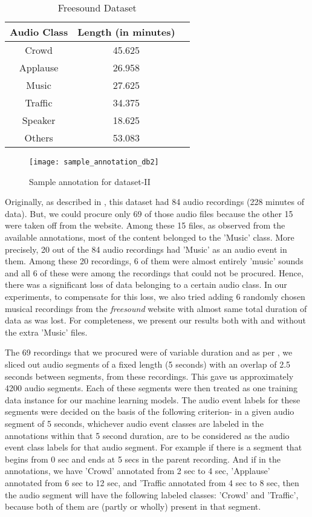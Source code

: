 \begin{table}[!hb]
\caption[Freesound dataset]{Freesound Dataset}
\label{tab:db2_bkg}
\centering
\begin{tabular}{ccc}
\toprule
Audio Class & Length (in minutes) \\ 
\midrule
Crowd	& 45.625 \\
Applause	& 26.958 \\
Music	& 27.625 \\
Traffic	& 34.375 \\
Speaker & 18.625 \\
Others & 53.083 \\
\bottomrule 
\end{tabular}
\end{table}

\begin{figure}[!htb] 
\centering 
\texttt{[image: sample\_annotation\_db2]} 
\caption[Sample annotation for dataset-II]{Sample annotation for dataset-II}
\label{fig:sample_annotation_db2} 
\end{figure}

Originally, as described in \cite{kons2013audio}, this dataset had 84 audio recordings (228 minutes of data). But, we could procure only 69 of those audio files because the other 15 were taken off from the website. Among these 15 files, as observed from the available annotations, most of the content belonged to the 'Music' class. More precisely, 20 out of the 84 audio recordings had 'Music' as an audio event in them. Among these 20 recordings, 6 of them were almost entirely 'music' sounds and all 6 of these were among the recordings that could not be procured. Hence, there was a significant loss of data belonging to a certain audio class. In our experiments, to compensate for this loss, we also tried adding 6 randomly chosen musical recordings from the \textsl{freesound} website with almost same total duration of data as was lost. For completeness, we present our results both with and without the extra 'Music' files.

The 69 recordings that we procured were of variable duration and as per \cite{kons2013audio}, we sliced out audio segments of a fixed length (5 seconds) with an overlap of 2.5 seconds between segments, from these recordings. This gave us approximately 4200 audio segments. Each of these segments were then treated as one training data instance for our machine learning models. The audio event labels for these segments were decided on the basis of the following criterion- in a given audio segment of 5 seconds, whichever audio event classes are labeled in the annotations within that 5 second duration, are to be considered as the audio event class labels for that audio segment. For example if there is a segment that begins from 0 sec and ends at 5 secs in the parent recording. And if in the annotations, we have 'Crowd' annotated from 2 sec to 4 sec, 'Applause' annotated from 6 sec to 12 sec, and 'Traffic annotated from 4 sec to 8 sec, then the audio segment will have the following labeled classes: 'Crowd' and 'Traffic', because both of them are (partly or wholly) present in that segment.

